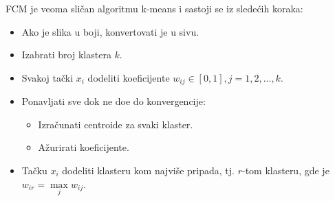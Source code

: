 \documentclass[12pt,a4paper]{article}
\theoremstyle{definition}
\theoremstyle{remark}
\theoremstyle{plain}
\begin{document}
FCM je veoma sli\v can algoritmu k-means i sastoji se iz slede\' cih koraka:
\begin{itemize}
  \item Ako je slika u boji, konvertovati je u sivu. 
  \item Izabrati broj klastera $k$.
  \item Svakoj ta\v cki $x_{i}$ dodeliti koeficijente $w_{ij} \in [0, 1], j=1,2,..., k$.
  \item Ponavljati sve dok ne do\dj e do konvergencije:
    \begin{itemize}
      \item Izra\v cunati centroide za svaki klaster.
      \item A\v zurirati koeficijente.
    \end{itemize}
  \item Ta\v cku $x_{i}$ dodeliti klasteru kom najvi\v se pripada, tj. $r$-tom klasteru, gde je $w_{ir}=\max\limits_{j} w_{ij}$.
\end{itemize}
\end{document}
